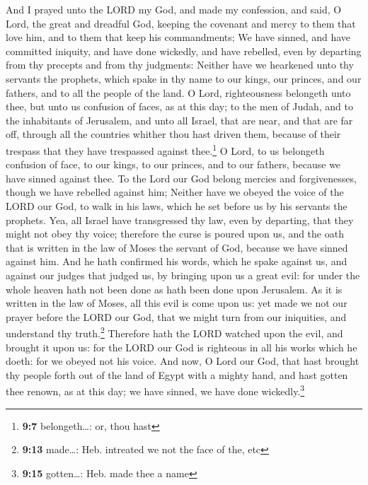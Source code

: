  And I prayed unto the LORD my God, and made my
confession, and said, O Lord, the great and dreadful God, keeping the
covenant and mercy to them that love him, and to them that keep his
commandments;  We have sinned, and have committed
iniquity, and have done wickedly, and have rebelled, even by departing
from thy precepts and from thy judgments:  Neither have we
hearkened unto thy servants the prophets, which spake in thy name to our
kings, our princes, and our fathers, and to all the people of the land.
 O Lord, righteousness belongeth unto thee, but unto us
confusion of faces, as at this day; to the men of Judah, and to the
inhabitants of Jerusalem, and unto all Israel, that are near, and that
are far off, through all the countries whither thou hast driven them,
because of their trespass that they have trespassed against
thee.\footnote{\textbf{9:7} belongeth\ldots: or, thou hast}
 O Lord, to us belongeth confusion of face, to our kings,
to our princes, and to our fathers, because we have sinned against thee.
 To the Lord our God belong mercies and forgivenesses,
though we have rebelled against him;  Neither have we
obeyed the voice of the LORD our God, to walk in his laws, which he set
before us by his servants the prophets.  Yea, all Israel
have transgressed thy law, even by departing, that they might not obey
thy voice; therefore the curse is poured upon us, and the oath that is
written in the law of Moses the servant of God, because we have sinned
against him.  And he hath confirmed his words, which he
spake against us, and against our judges that judged us, by bringing
upon us a great evil: for under the whole heaven hath not been done as
hath been done upon Jerusalem.  As it is written in the
law of Moses, all this evil is come upon us: yet made we not our prayer
before the LORD our God, that we might turn from our iniquities, and
understand thy truth.\footnote{\textbf{9:13} made\ldots: Heb. intreated
  we not the face of the, etc}  Therefore hath the LORD
watched upon the evil, and brought it upon us: for the LORD our God is
righteous in all his works which he doeth: for we obeyed not his voice.
 And now, O Lord our God, that hast brought thy people
forth out of the land of Egypt with a mighty hand, and hast gotten thee
renown, as at this day; we have sinned, we have done
wickedly.\footnote{\textbf{9:15} gotten\ldots: Heb. made thee a name}


